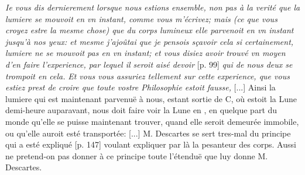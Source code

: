 \pend 
\count{}
\pstart  
[p. 98] \textit{Ie vous dis dernierement lorsque nous estions ensemble, non pas \`{a} la verit\'{e} que la lumiere se mouvoit en vn instant, comme vous m'\'{e}crivez; mais (ce que vous croyez estre la mesme chose) que du corps lumineux elle parvenoit en vn instant jusqu'\`{a} nos yeux: et mesme j'ajo\^{u}tai que je pensois s\c{c}avoir cela si certainement,}  \textit{lumiere ne se mouvoit pas en vn instant; et vous disiez avoir trouv\'{e} vn moyen d'en faire l'experience, par lequel il seroit ais\'{e} devoir} [p. 99] \textit{qui de nous deux se trompoit en cela.}
\pend 
\pstart 
[p. 99]  \textit{Et vous vous assuriez tellement sur cette experience, que vous estiez prest de croire que toute vostre Philosophie estoit fausse,} [...]
\pend 
\count{}
\pstart  
[p. 118] Ainsi la lumiere qui est maintenant parvenu\"{e} \`{a} nous, estant sortie de C, o\`{u} estoit la Lune demi-heure auparavant, nous doit faire voir la Lune en , en quelque part du monde qu'elle se puisse maintenant trouver, quand elle seroit demeur\'{e}e immobile, ou qu'elle auroit est\'{e} transport\'{e}e: [...]
\pend 
\pstart  [p. 146] M. Descartes se sert tres-mal du principe qui a est\'{e} expliqu\'{e} 
 [p. 147] voulant expliquer par l\`{a} la pesanteur des corps. Aussi ne pretend-on pas donner \`{a} ce principe toute l'\'{e}tendu\"{e} que luy donne M. Descartes.
